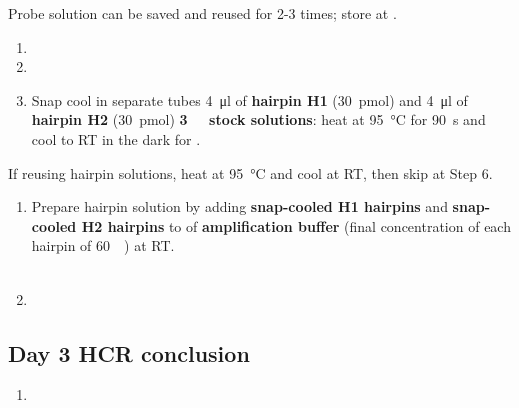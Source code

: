 \documentclass[12pt]{report}
\begin{document}
\bigskip\alert{Probe solution can be saved and reused for 2-3 times; store at \minustwenty.}

\begin{enumerate}[resume = steps]
	\item {}
	\item {}
	\item Snap cool in separate tubes \qty{4}{\ul} of \textbf{hairpin H1} (\qty{30}{\pmol}) and \qty{4}{\ul} of \textbf{hairpin H2} (\qty{30}{\pmol}) \textbf{\qty{3}{\micro\molar} stock solutions}: heat at \qty{95}{\degreeCelsius} for \qty{90}{\s} and cool to RT in the dark for \halfhour.
\end{enumerate}

\bigskip\alert{If reusing hairpin solutions, heat at \qty{95}{\degreeCelsius} and cool at RT, then skip at Step 6.}

\begin{enumerate}[resume = steps]
	\item Prepare hairpin solution by adding \textbf{snap-cooled H1 hairpins} and \textbf{snap-cooled H2 hairpins} to \twohunmicrol{} of \textbf{amplification buffer} (final concentration of each hairpin of \qty{60}{\nano\molar}) at RT.\\
	      \\
	\item {}
\end{enumerate}

\subsection*{Day 3 \textendash{} HCR conclusion}

\begin{enumerate}[series = steps]
	\item {}
\end{enumerate}
\end{document}
